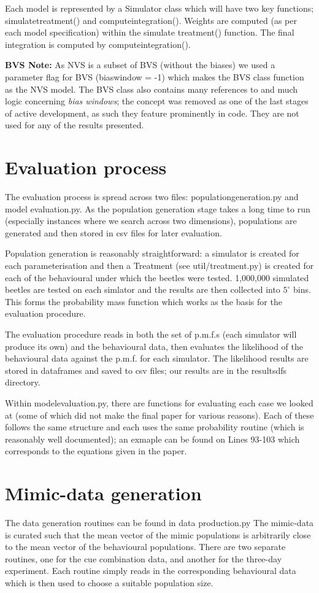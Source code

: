 \documentclass[10pt, a4paper]{article}
\begin{document}
Each model is represented by a Simulator class which will have two key
functions; simulate\textunderscore treatment() and
compute\textunderscore integration(). Weights are computed (as per
each model specification) within the simulate\textunderscore
treatment() function. The final integration is computed by
compute\textunderscore integration().

\textbf{BVS Note:} As NVS is a subset of BVS (without the biases) we
used a parameter flag for BVS (bias\textunderscore window = -1) which
makes the BVS class function as the NVS model. The BVS class also
contains many references to and much logic concerning \textit{bias
  windows}; the concept was removed as one of the last stages of active
development, as such they feature prominently in code. They are not
used for any of the results presented.

\section{Evaluation process}
The evaluation process is spread across two files:
population\textunderscore generation.py and model\textunderscore
evaluation.py. As the population generation stage takes a long time to
run (especially instances where we search across two dimensions),
populations are generated and then stored in csv files for later
evaluation.

Population generation is reasonably straightforward: a simulator is
created for each parameterisation and then a Treatment (see
util/treatment.py) is created for each of the behavioural under which
the beetles were tested. 1,000,000 simulated beetles are tested on
each simlator and the results are then collected into $5^\circ$
bins. This forms the probability mass function which works as the
basis for the evaluation procedure.

The evaluation procedure reads in both the set of p.m.f.s (each
simulator will produce its own) and the behavioural data, then
evaluates the likelihood of the behavioural data against the
p.m.f. for each simulator. The likelihood results are stored in
dataframes and saved to csv files; our results are in the
results\textunderscore dfs directory.

Within model\textunderscore evaluation.py, there are functions for
evaluating each case we looked at (some of which did not make the
final paper for various reasons). Each of these follows the same
structure and each uses the same probability routine (which is
reasonably well documented); an exmaple can be found on Lines 93-103
which corresponds to the equations given in the paper.

\section{Mimic-data generation}
The data generation routines can be found in data\textunderscore
production.py The mimic-data is curated such that the mean vector of
the mimic populations is arbitrarily close to the mean vector of the
behavioural populations. There are two separate routines, one for the
cue combination data, and another for the three-day experiment. Each
routine simply reads in the corresponding behavioural data which is
then used to choose a suitable population size.
\end{document}
